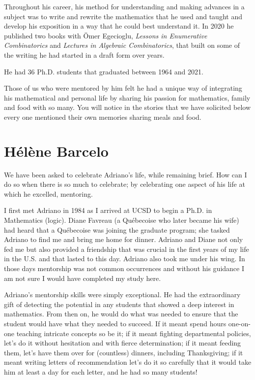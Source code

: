 \documentclass{notices}
\begin{document}
Throughout his career, his method for understanding and making advances in a subject was to write and rewrite the mathematics that he used and taught and develop his exposition in a way that he could best understand it.  In 2020 he published two books with Ömer Egecioglu, {\it Lessons in Enumerative Combinatorics} and {\it Lectures in Algebraic Combinatorics}, that built on some of the writing he had started in a draft form over years.

He had 36 Ph.D. students that graduated between 1964 and 2021.

Those of us who were mentored by him felt he had a unique way of integrating his mathematical and personal life by sharing his passion for mathematics, family and food with so many.  You will notice in the stories that we have solicited below every one mentioned their own memories sharing meals and food.

\section*{H\'el\`ene Barcelo}

We have been asked to celebrate Adriano's life, while remaining brief. How can I do so when there is so much to celebrate; by celebrating one aspect of his life at which he excelled, mentoring.

I first met Adriano in 1984 as I arrived at UCSD to begin a Ph.D. in Mathematics (logic). Diane Favreau (a Qu\'ebecoise who later became his wife) had heard that a Qu\'ebecoise was joining the graduate program; she tasked Adriano to find me and bring me home for dinner. Adriano and Diane not only fed me but also provided a friendship that was crucial in the first years of my life in the U.S. and that lasted to this day. Adriano also took me under his wing. In those days mentorship was not common occurrences and without his guidance I am not sure I would have completed my study here.

Adriano's mentorship skills were simply exceptional.  He had the extraordinary gift of detecting the potential in any students that showed a deep interest in mathematics. From then on, he would do what was needed to ensure that the student would have what they needed to succeed. If it meant spend hours one-on-one teaching intricate concepts so be it; if it meant fighting  departmental policies, let's do it without hesitation and with fierce determination; if it meant feeding them, let's have them over for (countless) dinners, including Thanksgiving; if it meant writing letters of recommendation let's do it so carefully that it would take him at least a day for each letter, and he had so many students!
\end{document}
